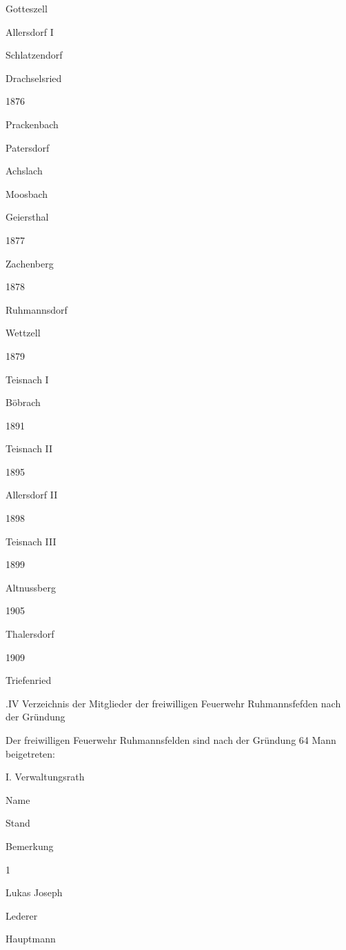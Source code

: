 Gotteszell



Allersdorf I



Schlatzendorf



Drachselsried

1876

Prackenbach



Patersdorf



Achslach



Moosbach



Geiersthal

1877

Zachenberg

1878

Ruhmannsdorf



Wettzell

1879

Teisnach I



Böbrach

1891

Teisnach II

1895

Allersdorf II

1898

Teisnach III

1899

Altnussberg

1905

Thalersdorf

1909

Triefenried

.IV Verzeichnis der Mitglieder der freiwilligen Feuerwehr Ruhmannsfefden nach
der Gründung

Der freiwilligen Feuerwehr Ruhmannsfelden sind nach der Gründung 64 Mann
beigetreten:



I. Verwaltungsrath



Name

Stand

Bemerkung

1

Lukas Joseph

Lederer

Hauptmann

